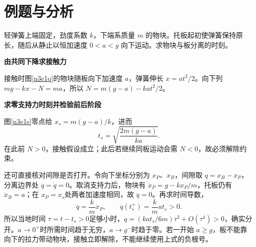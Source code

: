 \section{例题与分析}
\begin{question}\begin{example}[下降托板与悬挂弹簧]\label{n3e1}
轻弹簧上端固定，劲度系数 $k$，下端系质量 $m$ 的物块。托板起初使弹簧保持原长，随后从静止以恒加速度 $0<a<g$ 向下运动。求物块与板分离的时刻。
\end{example}\end{question}
\begin{solution}\textbf{由共同下降求接触力}\par\nobreak
接触时图\ref{n3e1q}的物块随板向下加速度 $a$，弹簧伸长 $x=at^2/2$。向下列 $mg-kx-N=ma$，所以 $N=m(g-a)-kat^2/2$。


\par\medskip{}\noindent\textbf{求零支持力时刻并检验前后阶段}\par\nobreak
图\ref{n3e1s}零点给 $x_s=m(g-a)/k$，进而
\[t_s=\sqrt{\frac{2m(g-a)}{ka}}.\]
在此前 $N>0$，接触假设成立；此后若继续同板运动会需 $N<0$，故必须解除约束。

还可直接核对间隙是否打开。令向下坐标分别为 $x_P$、$x_B$，间隙取 $q=x_B-x_P$，分离边界处 $q=\dot q=0$。取消支持力后，物块有 $\ddot x_P=g-kx_P/m$，托板仍有 $\ddot x_B=a$；在 $x_P=x_s$处两者加速度相同，故 $\ddot q=0$。再求时间导数，
\[
 \dddot q=\frac{k}{m}\dot x_P,\qquad
 \dddot q(t_s^+)=\frac{k}{m}at_s>0.
\]
所以当地时间 $\tau=t-t_s>0$足够小时，$q=(kat_s/6m)\tau^3+O(\tau^4)>0$，确实分开。$a\to0^+$时所需时间趋于无穷，$a\to g^-$时趋于零。若一开始 $a\ge g$，板不能靠向下的拉力带动物块，接触立即解除，不能继续使用上式的负根号。
\end{solution}

